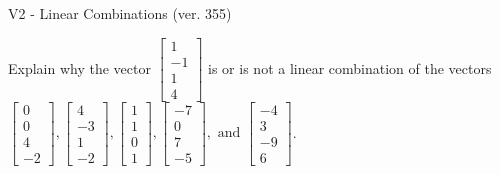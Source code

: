 \begin{exercise}
  \begin{exerciseTitle}V2 - Linear Combinations (ver. 355)\end{exerciseTitle}
  \begin{exerciseStatement}
    Explain why the vector \(\left[\begin{array}{c}
1 \\
-1 \\
1 \\
4
\end{array}\right]\)  is or is not a linear 
	combination of the vectors \(\left[\begin{array}{c}
0 \\
0 \\
4 \\
-2
\end{array}\right] , \left[\begin{array}{c}
4 \\
-3 \\
1 \\
-2
\end{array}\right] , \left[\begin{array}{c}
1 \\
1 \\
0 \\
1
\end{array}\right] , \left[\begin{array}{c}
-7 \\
0 \\
7 \\
-5
\end{array}\right] , \text{ and } \left[\begin{array}{c}
-4 \\
3 \\
-9 \\
6
\end{array}\right]\).
	



\end{exerciseStatement}
\end{exercise}
